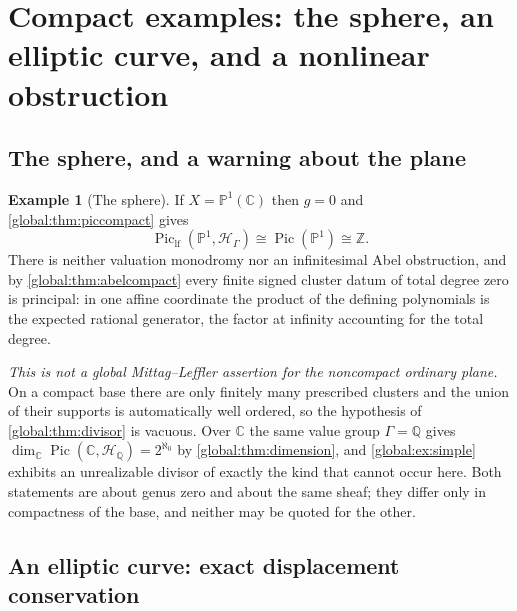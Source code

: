 \documentclass[11pt,letterpaper]{article}
\theoremstyle{definition}
\newtheorem{example}[example]{Example}
\theoremstyle{remark}
\newcommand{\C}{\mathbb C}
\newcommand{\Z}{\mathbb Z}
\newcommand{\Q}{\mathbb Q}
\newcommand{\HH}{\mathscr H_\Gamma}
\newcommand{\Pic}{\operatorname{Pic}}
\newcommand{\Piclf}{\operatorname{Pic}_{\mathrm{lf}}}
\numberwithin{equation}{section}
\begin{document}
\section{Compact examples: the sphere, an elliptic curve, and a nonlinear obstruction}\label{global:sec:compactexamples}

\subsection{The sphere, and a warning about the plane}

\begin{example}[The sphere]\label{global:ex:sphere}
If $X=\mathbb P^1(\C)$ then $g=0$ and \cref{global:thm:piccompact} gives
\[
  \Piclf(\mathbb P^1,\HH)\cong\Pic(\mathbb P^1)\cong\Z .
\]
There is neither valuation monodromy nor an infinitesimal Abel obstruction, and by \cref{global:thm:abelcompact} every finite signed cluster datum of total degree zero is principal: in one affine coordinate the product of the defining polynomials is the expected rational generator, the factor at infinity accounting for the total degree.

\emph{This is not a global Mittag--Leffler assertion for the noncompact ordinary plane.} On a compact base there are only finitely many prescribed clusters and the union of their supports is automatically well ordered, so the hypothesis of \cref{global:thm:divisor} is vacuous. Over $\C$ the same value group $\Gamma=\Q$ gives $\dim_\C\Pic(\C,\mathscr H_\Q)=2^{\aleph_0}$ by \cref{global:thm:dimension}, and \cref{global:ex:simple} exhibits an unrealizable divisor of exactly the kind that cannot occur here. Both statements are about genus zero and about the same sheaf; they differ only in compactness of the base, and neither may be quoted for the other.
\end{example}

\subsection{An elliptic curve: exact displacement conservation}
\end{document}
